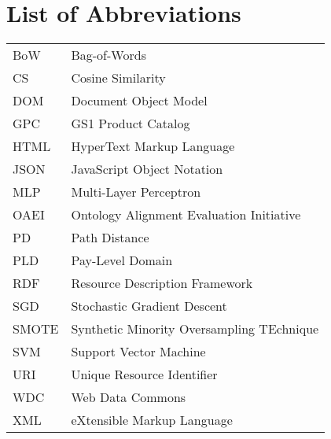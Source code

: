 \chapter*{List of Abbreviations}

\begin{table}[htbp]
    \begin{center}
        \begin{tabularx}{\textwidth}{lX}
            BoW & Bag-of-Words \\
            CS & Cosine Similarity \\
            DOM & Document Object Model \\
            GPC & GS1 Product Catalog \\
            HTML & HyperText Markup Language \\
            JSON & JavaScript Object Notation \\
            MLP & Multi-Layer Perceptron \\
            OAEI & Ontology Alignment Evaluation Initiative \\
            PD & Path Distance \\
            PLD & Pay-Level Domain \\
            RDF & Resource Description Framework \\
            SGD & Stochastic Gradient Descent \\
            SMOTE & Synthetic Minority Oversampling TEchnique \\
            SVM & Support Vector Machine \\
            URI & Unique Resource Identifier \\
            WDC & Web Data Commons \\
            XML & eXtensible Markup Language \\
        \end{tabularx}
    \end{center}
    \label{tab:glossary}
\end{table}
